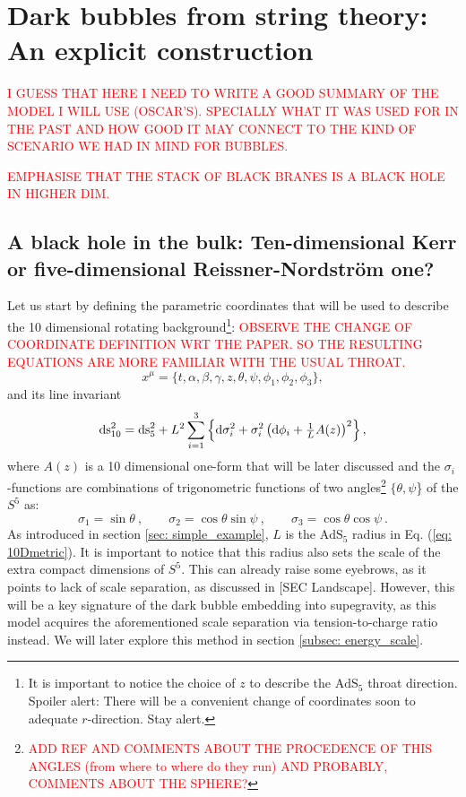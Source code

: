 \section{Dark bubbles from string theory: An explicit construction}\label{sec: db_from_st}
\textcolor{red}{I GUESS THAT HERE I NEED TO WRITE A GOOD SUMMARY OF THE MODEL I WILL USE (OSCAR'S). SPECIALLY WHAT IT WAS USED FOR IN THE PAST AND HOW GOOD IT MAY CONNECT TO THE KIND OF SCENARIO WE HAD IN MIND FOR BUBBLES.}

\textcolor{red}{EMPHASISE THAT THE STACK OF BLACK BRANES IS A BLACK HOLE IN HIGHER DIM.}
\subsection{A black hole in the bulk: Ten-dimensional Kerr or five-dimensional Reissner-Nordström one?}
Let us start by defining the parametric coordinates that will be used to describe the 10 dimensional rotating background\footnote{It is important to notice the choice of $z$ to describe the $\text{AdS}_{5}$ throat direction. Spoiler alert: There will be a convenient change of coordinates soon to adequate $r$-direction. Stay alert.}:
\textcolor{red}{OBSERVE THE CHANGE OF COORDINATE DEFINITION WRT THE PAPER. SO THE RESULTING EQUATIONS ARE MORE FAMILIAR WITH THE USUAL THROAT.}
\begin{equation}\label{eq: 10D_coordinates}
	x^{\mu} = \{t, \alpha, \beta, \gamma, z, \theta, \psi, \phi_{1},\phi_{2},\phi_{3}\},
\end{equation}
and its line invariant
\begin{equation}\label{eq: 10Dmetric}
  \text{ds}_{10}^2= \text{ds}_5^2 + L^2 \sum_{i=1}^3 \left\{ \text{d}\sigma_i^2 + \sigma_i^2 \left( \text{d}\phi_i + \tfrac{1}{L} A(z) \right)^2 \right\},
\end{equation}
where $A(z)$ is a 10 dimensional one-form that will be later discussed and the $\sigma_i$-functions are combinations of trigonometric functions of two angles\footnote{\textcolor{red}{ADD REF AND COMMENTS ABOUT THE PROCEDENCE OF THIS ANGLES (from where to where do they run) AND PROBABLY, COMMENTS ABOUT THE SPHERE?}} $\{\theta, \psi$\} of the $S^{5}$ as:
\begin{equation}
 \sigma_1 = \sin\theta \ , \qquad \sigma_2 = \cos\theta \sin\psi \ , \qquad \sigma_3 = \cos\theta \cos\psi \ .
\end{equation}
As introduced in section \ref{sec: simple_example}, $L$ is the $\text{AdS}_{5}$ radius in Eq. (\ref{eq: 10Dmetric}). It is important to notice that this radius also sets the scale of the extra compact dimensions of $S^{5}$. This can already raise some eyebrows, as it points to lack of scale separation, as discussed in [SEC Landscape]. However, this will be a key signature of the dark bubble embedding into supegravity, as this model acquires the aforementioned scale separation via tension-to-charge ratio instead. We will later explore this method in section \ref{subsec: energy_scale}. 

